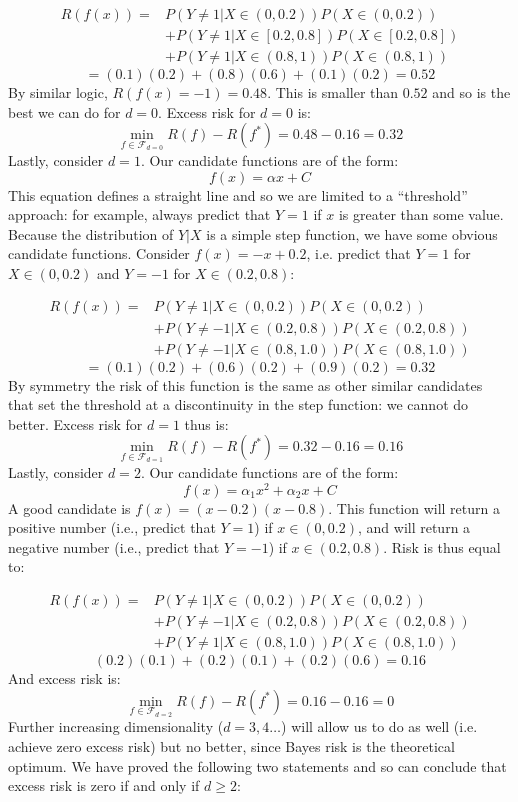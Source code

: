 \documentclass{report}
\begin{document}
\begin{equation*}
	\begin{split}
		R(f(x)) = & P(Y \neq 1 | X\in(0, 0.2))P(X\in(0, 0.2)) \\
		  & + P(Y \neq 1 | X\in[0.2, 0.8])P(X\in[0.2, 0.8]) \\ 
		  & + P(Y \neq 1 | X\in(0.8, 1))P(X\in(0.8, 1))
	\end{split}
\end{equation*}
$$
=(0.1)(0.2) + (0.8)(0.6) + (0.1)(0.2) = 0.52
$$
By similar logic, $R(f(x)=-1) = 0.48$. This is smaller than $0.52$ and so is the
best we can do for $d=0$. Excess risk for $d=0$ is:
$$
\min_{f \in \mathcal{F}_{d=0}} R(f) - R(f^*) = 0.48 - 0.16 = 0.32
$$
Lastly, consider $d=1$. Our candidate functions are of the form:
$$
f(x) = \alpha x + C
$$
This equation defines a straight line and so we are limited to a
``threshold'' approach: for example, always predict that $Y=1$ if $x$ is greater
than some value. Because the distribution of $Y|X$ is a simple step function, we
have some obvious candidate functions. Consider 
$f(x)=-x+0.2$, i.e. predict that $Y=1$ for
$X \in (0, 0.2)$ and $Y=-1$ for $X\in(0.2, 0.8)$:

\begin{equation*}
	\begin{split}
		R(f(x)) = & P(Y \neq 1  | X\in(0, 0.2))P(X\in(0, 0.2))  \\
		  & + P(Y \neq -1  | X\in(0.2, 0.8))P(X\in(0.2, 0.8))  \\ 
		  & + P(Y \neq -1 | X\in(0.8, 1.0))P(X\in(0.8,1.0)) 
	\end{split}
\end{equation*}
$$
= (0.1)(0.2) + (0.6)(0.2) + (0.9)(0.2) = 0.32
$$
By symmetry the risk of this function is the same as
other similar candidates that set the threshold at a discontinuity in the step
function: we cannot do better. Excess risk for $d=1$ thus is:
$$
\min_{f \in \mathcal{F}_{d=1}} R(f) - R(f^*) = 0.32 - 0.16 = 0.16
$$
Lastly, consider $d=2$. Our candidate functions are of the form:
$$
f(x) = \alpha_1 x^2 + \alpha_2 x + C
$$
A good candidate is $f(x)=(x-0.2)(x-0.8)$. This function will return a positive
number (i.e., predict that $Y=1$) if $x \in (0, 0.2)$, and will return a
negative number (i.e., predict that $Y=-1$) if $x \in (0.2, 0.8)$. Risk is thus
equal to:

\begin{equation*}
	\begin{split}
		R(f(x)) = & P(Y \neq 1  | X\in(0, 0.2))P(X\in(0, 0.2))  \\
		  & + P(Y \neq -1  | X\in(0.2, 0.8))P(X\in(0.2, 0.8))  \\ 
		  & + P(Y \neq 1 | X\in(0.8, 1.0))P(X\in(0.8,1.0)) 
	\end{split}
\end{equation*}
$$
(0.2)(0.1) + (0.2)(0.1) + (0.2)(0.6) = 0.16
$$
And excess risk is:
$$
\min_{f \in \mathcal{F}_{d=2}} R(f) - R(f^*) = 0.16 - 0.16 = 0
$$
Further increasing dimensionality ($d=3, 4\ldots$) will allow
us to do as well (i.e. achieve zero excess risk) but no better, since Bayes
risk is the theoretical optimum. We have proved the following two statements 
and so can conclude that excess risk is zero if and only if $d \geq 2$:
\end{document}
